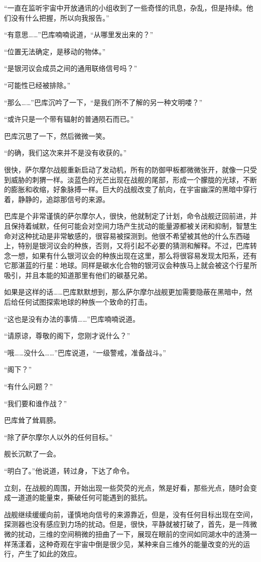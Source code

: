 “一直在监听宇宙中开放通讯的小组收到了一些奇怪的讯息，杂乱，但是持续。他们没有什么把握，所以向我报告。” 

“有意思……”巴库喃喃说道，“从哪里发出来的？” 

“位置无法确定，是移动的物体。” 

“是银河议会成员之间的通用联络信号吗？” 

“可能性已经被排除。” 

“那么……”巴库沉吟了一下，“是我们所不了解的另一种文明喽？” 

“或许只是一个带有辐射的普通陨石而已。” 

巴库沉思了一下，然后微微一笑。 

“的确，我们这次来并不是没有收获的。” 

很快，萨尔摩尔战舰重新启动了发动机，所有的防御甲板都微微张开，就像一只受到威胁的刺猬一样。淡蓝色的光芒出现在战舰的尾部，形成一个朦胧的光球，不断的膨胀和收缩，好象脉搏一样。巨大的战舰改变了航向，在宇宙幽深的黑暗中穿行着，静静的，追踪那信号的来源。 

巴库是个非常谨慎的萨尔摩尔人，很快，他就制定了计划，命令战舰迂回前进，并且保持着缄默，任何可能会对空间力场产生扰动的能量源都被关闭和抑制，智慧生命对这种扰动是非常敏感的，很容易被探测到。他很不希望被其他的什么东西碰上，特别是银河议会的种族，否则，又将引起不必要的猜测和解释。不过，巴库转念一想，如果有什么银河议会的种族出现在这里，那么将很容易发现太阳系，还有它那湛蓝的行星：地球。同样是碳水化合物的银河议会种族马上就会被这个行星所吸引，并且本能的知道那里有他们的碳基兄弟。 

如果是这样的话……巴库默默想到，那么萨尔摩尔战舰更加需要隐蔽在黑暗中，然后给任何试图探索地球的种族一个致命的打击。 

“这也是没有办法的事情……”巴库喃喃说道。 

“请原谅，尊敬的阁下，您刚才说什么？” 

“哦……没什么……”巴库说道，“一级警戒，准备战斗。” 

“阁下？” 

“有什么问题？” 

“我们要和谁作战？” 

巴库耸了耸肩膀。 

“除了萨尔摩尔人以外的任何目标。” 

舰长沉默了一会。 

“明白了。”他说道，转过身，下达了命令。 

立刻，在战舰的周围，开始出现一些荧荧的光点，煞是好看，那些光点，随时会变成一道道的能量束，撕破任何可能遇到的抵抗。 

战舰继续缓缓向前，谨慎地向信号的来源靠近，但是，没有任何目标出现在空间，探测器也没有感应到力场的扰动。但是，很快，平静就被打破了，首先，是一阵微微的扰动，三维的空间稍微的扭曲了一下，展现在眼前的空间如同湖水中的涟漪一样荡漾着，这种奇观在宇宙中倒是很少见，某种来自三维外的能量改变的光的运行，产生了如此的效应。 


